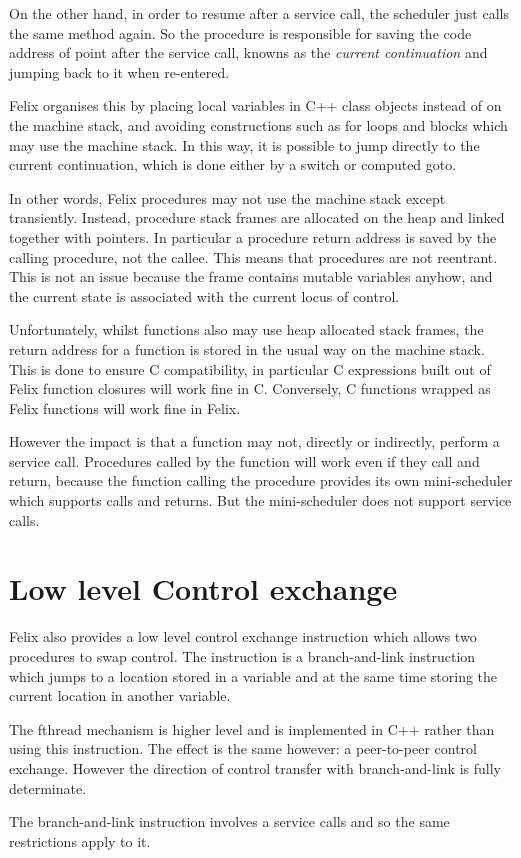 \documentclass{article}
\begin{document}
On the other hand, in order to resume after a service
call, the scheduler just calls the same method again.
So the procedure is responsible for saving the 
code address of point after the service call,
knowns as the {\em current continuation} and jumping
back to it when re-entered.

Felix organises this by placing local variables in C++
class objects instead of on the machine stack, and avoiding
constructions such as for loops and blocks which may
use the machine stack. In this way, it is possible to jump
directly to the current continuation, which is done either
by a switch or computed goto.

In other words, Felix procedures may not use the machine
stack except transiently. Instead, procedure stack frames
are allocated on the heap and linked together with pointers.
In particular a procedure return address is saved by
the calling procedure, not the callee. This means 
that procedures are not reentrant. This is not an issue
because the frame contains mutable variables anyhow,
and the current state is associated with the current
locus of control.

Unfortunately, whilst functions also may use heap allocated
stack frames, the return address for a function is stored
in the usual way on the machine stack. This is done to
ensure C compatibility, in particular C expressions built
out of Felix function closures will work fine in C.
Conversely, C functions wrapped as Felix functions will
work fine in Felix.

However the impact is that a function may not, directly
or indirectly, perform a service call. Procedures
called by the function will work even if they call
and return, because the function calling the procedure
provides its own mini-scheduler which supports calls
and returns. But the mini-scheduler does not support
service calls.

\section{Low level Control exchange}
Felix also provides a low level control exchange
instruction which allows two procedures to swap
control. The instruction is a branch-and-link
instruction which jumps to a location stored
in a variable and at the same time storing the
current location in another variable.

The fthread mechanism is higher level and is implemented
in C++ rather than using this instruction. The effect
is the same however: a peer-to-peer control exchange.
However the direction of control transfer with branch-and-link
is fully determinate. 

The branch-and-link instruction involves a service calls
and so the same restrictions apply to it.
\end{document}
